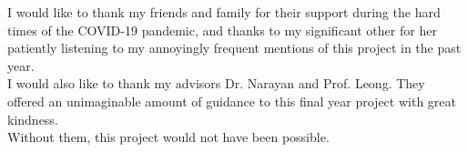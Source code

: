 \documentclass[fyp]{socreport}
\begin{document}
\begin{acknowledgement}
I would like to thank my friends and family for their support during the hard times of the COVID-19 pandemic, and thanks to my significant other for her patiently listening to my annoyingly frequent mentions of this project in the past year.\\
I would also like to thank my advisors Dr. Narayan and Prof. Leong. They offered an unimaginable amount of guidance to this final year project with great kindness.\\
Without them, this project would not have been possible.\\
\end{acknowledgement}

\listoffigures 
\listoftables
\tableofcontents










\appendix





\end{document}
